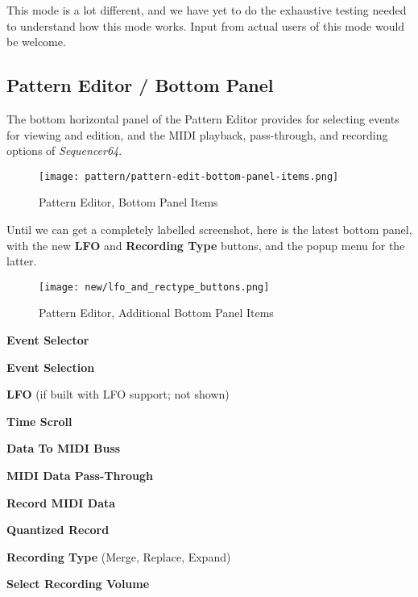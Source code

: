    This mode is a lot different, and we have yet to do the exhaustive testing
   needed to understand how this mode works.  Input from actual users of this
   mode would be welcome.

\subsection{Pattern Editor / Bottom Panel}
\label{subsec:seq64_pattern_editor_bottom}

   The bottom horizontal panel of the Pattern Editor provides for
   selecting events for viewing and edition, and the MIDI playback,
   pass-through, and recording options of \textsl{Sequencer64}.

\begin{figure}[H]
   \centering 
   \texttt{[image: pattern/pattern-edit-bottom-panel-items.png]}
   \caption{Pattern Editor, Bottom Panel Items}
   \label{fig:pattern_editor_bottom_panel_items}
\end{figure}

   Until we can get a completely labelled screenshot, here is the
   latest bottom panel, with the new \textbf{LFO}
   and \textbf{Recording Type} buttons, and the popup menu for the latter.

\begin{figure}[H]
   \centering 
   \texttt{[image: new/lfo\_and\_rectype\_buttons.png]}
   \caption{Pattern Editor, Additional Bottom Panel Items}
   \label{fig:pattern_editor_added_bottom_panel_items}
\end{figure}

   \begin{enumber}
      \item \textbf{Event Selector}
      \item \textbf{Event Selection}
      \item \textbf{LFO} (if built with LFO support; not shown)
      \item \textbf{Time Scroll}
      \item \textbf{Data To MIDI Buss}
      \item \textbf{MIDI Data Pass-Through}
      \item \textbf{Record MIDI Data}
      \item \textbf{Quantized Record}
      \item \textbf{Recording Type} (Merge, Replace, Expand)
      \item \textbf{Select Recording Volume}
   \end{enumber}

